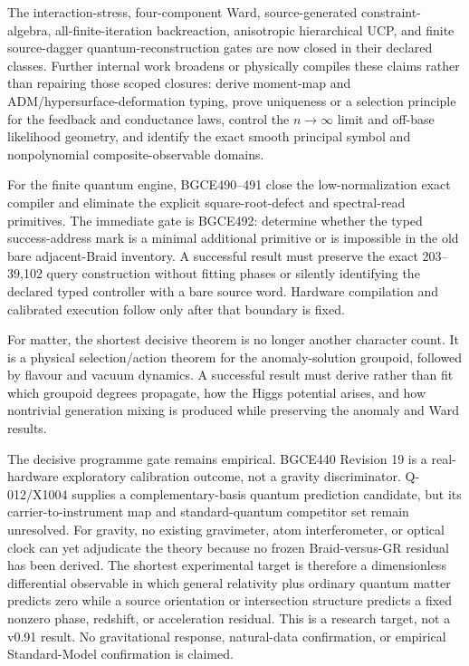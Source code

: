 \documentclass[11pt]{article}
\theoremstyle{definition}
\theoremstyle{remark}
\begin{document}
The interaction-stress, four-component Ward, source-generated constraint-algebra, all-finite-iteration backreaction, anisotropic hierarchical UCP, and finite source-dagger quantum-reconstruction gates are now closed in their declared classes. Further internal work broadens or physically compiles these claims rather than repairing those scoped closures: derive moment-map and ADM/hypersurface-deformation typing, prove uniqueness or a selection principle for the feedback and conductance laws, control the $n\to\infty$ limit and off-base likelihood geometry, and identify the exact smooth principal symbol and nonpolynomial composite-observable domains.

For the finite quantum engine, BGCE490--491 close the low-normalization exact compiler and eliminate the explicit square-root-defect and spectral-read primitives. The immediate gate is BGCE492: determine whether the typed success-address mark is a minimal additional primitive or is impossible in the old bare adjacent-Braid inventory. A successful result must preserve the exact 203--39,102 query construction without fitting phases or silently identifying the declared typed controller with a bare source word. Hardware compilation and calibrated execution follow only after that boundary is fixed.

For matter, the shortest decisive theorem is no longer another character count. It is a physical selection/action theorem for the anomaly-solution groupoid, followed by flavour and vacuum dynamics. A successful result must derive rather than fit which groupoid degrees propagate, how the Higgs potential arises, and how nontrivial generation mixing is produced while preserving the anomaly and Ward results.

The decisive programme gate remains empirical. BGCE440 Revision 19 is a real-hardware exploratory calibration outcome, not a gravity discriminator. Q-012/X1004 supplies a complementary-basis quantum prediction candidate, but its carrier-to-instrument map and standard-quantum competitor set remain unresolved. For gravity, no existing gravimeter, atom interferometer, or optical clock can yet adjudicate the theory because no frozen Braid-versus-GR residual has been derived. The shortest experimental target is therefore a dimensionless differential observable in which general relativity plus ordinary quantum matter predicts zero while a source orientation or intersection structure predicts a fixed nonzero phase, redshift, or acceleration residual. This is a research target, not a v0.91 result. No gravitational response, natural-data confirmation, or empirical Standard-Model confirmation is claimed.
\end{document}
